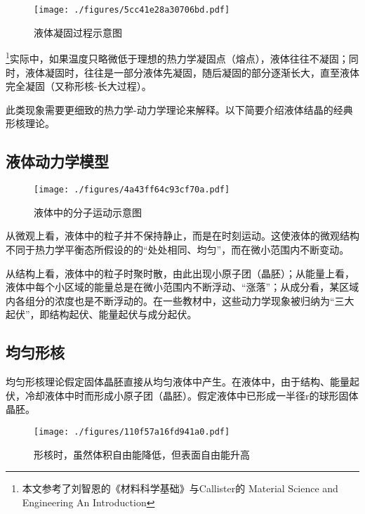 
\begin{issues}
\issueDraft
{}
\end{issues}

\begin{figure}[ht]
\centering
\texttt{[image: ./figures/5cc41e28a30706bd.pdf]}
\caption{液体凝固过程示意图} \label{fig_NCLT_6}
\end{figure}
\footnote{本文参考了刘智恩的《材料科学基础》与Callister的 Material Science and Engineering An Introduction}实际中，如果温度只略微低于理想的热力学凝固点（熔点），液体往往不凝固；同时，液体凝固时，往往是一部分液体先凝固，随后凝固的部分逐渐长大，直至液体完全凝固（又称形核-长大过程）。

此类现象需要更细致的热力学-动力学理论来解释。以下简要介绍液体结晶的经典形核理论。

\subsection{液体动力学模型}
\begin{figure}[ht]
\centering
\texttt{[image: ./figures/4a43ff64c93cf70a.pdf]}
\caption{液体中的分子运动示意图} \label{fig_NCLT_5}
\end{figure}
从微观上看，液体中的粒子并不保持静止，而是在时刻运动。这使液体的微观结构不同于热力学平衡态所假设的的“处处相同、均匀”，而在微小范围内不断变动。

从结构上看，液体中的粒子时聚时散，由此出现小原子团（晶胚）；从能量上看，液体中每个小区域的能量总是在微小范围内不断浮动、“涨落”；从成分看，某区域内各组分的浓度也是不断浮动的。在一些教材中，这些动力学现象被归纳为“三大起伏”，即结构起伏、能量起伏与成分起伏。

\subsection{均匀形核}
均匀形核理论假定固体晶胚直接从均匀液体中产生。在液体中，由于结构、能量起伏，冷却液体中时而形成小原子团（晶胚）。假定液体中已形成一半径r的球形固体晶胚。
\begin{figure}[ht]
\centering
\texttt{[image: ./figures/110f57a16fd941a0.pdf]}
\caption{形核时，虽然体积自由能降低，但表面自由能升高} \label{fig_NCLT_1}
\end{figure}

